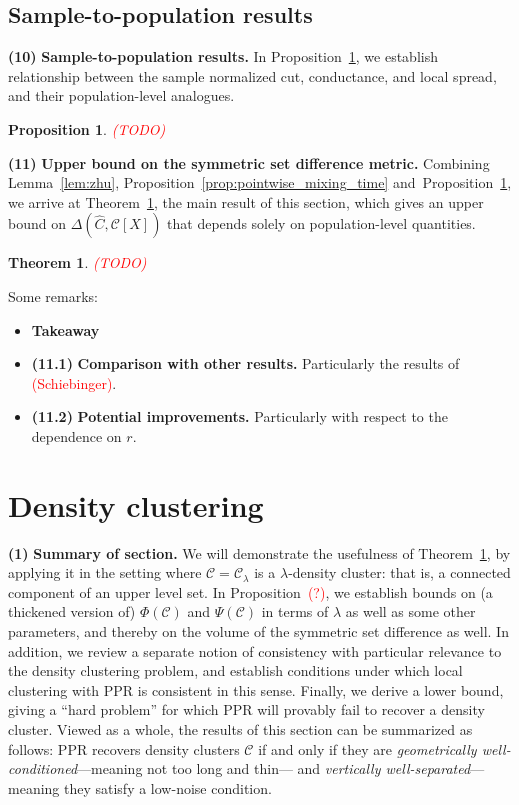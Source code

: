 \documentclass{article}
\newcommand{\1}{\mathbf{1}}
\newcommand{\mc}[1]{\mathcal{#1}}
\newcommand{\wh}[1]{\widehat{#1}}
\theoremstyle{alden}
\theoremstyle{aldenthm}
\newtheorem{theorem}{Theorem}
\newtheorem{proposition}{Proposition}
\theoremstyle{definition}
\theoremstyle{remark}
\begin{document}
\subsection{Sample-to-population results}
\textbf{(10)} \textbf{Sample-to-population results.} In Proposition~\ref{prop:sample_to_population}, we establish relationship between the sample normalized cut, conductance, and local spread, and their population-level analogues. 

\begin{proposition}
	\label{prop:sample_to_population}
	\textcolor{red}{(TODO)}
\end{proposition}

\textbf{(11)} \textbf{Upper bound on the symmetric set difference metric.} Combining Lemma~\ref{lem:zhu}, Proposition~\ref{prop:pointwise_mixing_time} and~Proposition~\ref{prop:sample_to_population}, we arrive at Theorem~\ref{thm:volume_ssd_ub}, the main result of this section, which gives an upper bound on $\Delta(\wh{C},\mc{C}[X])$ that depends solely on population-level quantities.

\begin{theorem}
	\label{thm:volume_ssd_ub} 
	\textcolor{red}{(TODO)}
\end{theorem}

Some remarks:
\begin{itemize}
	\item \textbf{Takeaway}
	\item \textbf{(11.1)} \textbf{Comparison with other results.} Particularly the results of \textcolor{red}{(Schiebinger)}. 
	\item \textbf{(11.2)} \textbf{Potential improvements.} Particularly with respect to the dependence on $r$.
\end{itemize}

\section{Density clustering}

\textbf{(1)} \textbf{Summary of section.} We will demonstrate the usefulness of Theorem~\ref{thm:volume_ssd_ub}, by applying it in the setting where $\mc{C} = \mc{C}_{\lambda}$ is a $\lambda$-density cluster: that is, a connected component of an upper level set. In Proposition~\textcolor{red}{(?)}, we establish bounds on (a thickened version of) $\Phi(\mc{C})$ and $\Psi(\mc{C})$ in terms of $\lambda$ as well as some other parameters, and thereby on the volume of the symmetric set difference as well. In addition, we review a separate notion of consistency with particular relevance to the density clustering problem, and establish conditions under which local clustering with PPR is consistent in this sense. Finally, we derive a lower bound, giving a ``hard problem'' for which PPR will provably fail to recover a density cluster. Viewed as a whole, the results of this section can be summarized as follows: PPR recovers density clusters $\mc{C}$ if and only if they are \emph{geometrically well-conditioned}---meaning not too long and thin--- and \emph{vertically well-separated}---meaning they satisfy a low-noise condition.
\end{document}
